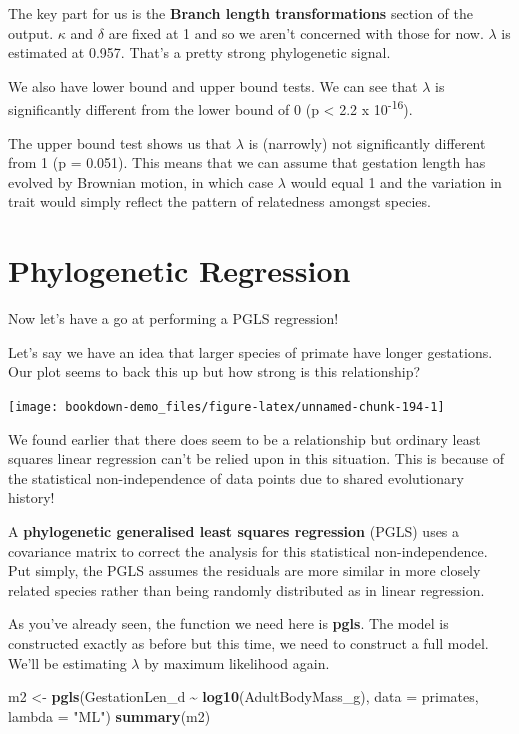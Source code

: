 \documentclass[
]{book}
\newenvironment{Shaded}{\begin{snugshade}}{\end{snugshade}}
\newcommand{\DataTypeTok}[1]{\textcolor[rgb]{0.13,0.29,0.53}{#1}}
\newcommand{\KeywordTok}[1]{\textcolor[rgb]{0.13,0.29,0.53}{\textbf{#1}}}
\newcommand{\NormalTok}[1]{#1}
\newcommand{\OperatorTok}[1]{\textcolor[rgb]{0.81,0.36,0.00}{\textbf{#1}}}
\newcommand{\StringTok}[1]{\textcolor[rgb]{0.31,0.60,0.02}{#1}}
\begin{document}
The key part for us is the \textbf{Branch length transformations} section of the output. \(\kappa\) and \(\delta\) are fixed at 1 and so we aren't concerned with those for now. \(\lambda\) is estimated at 0.957. That's a pretty strong phylogenetic signal.

We also have lower bound and upper bound tests. We can see that \(\lambda\) is significantly different from the lower bound of 0 (p \textless{} 2.2 x 10\textsuperscript{-16}).

The upper bound test shows us that \(\lambda\) is (narrowly) not significantly different from 1 (p = 0.051). This means that we can assume that gestation length has evolved by Brownian motion, in which case \(\lambda\) would equal 1 and the variation in trait would simply reflect the pattern of relatedness amongst species.

\hypertarget{phylogenetic-regression}{%
\section{Phylogenetic Regression}\label{phylogenetic-regression}}

Now let's have a go at performing a PGLS regression!

Let's say we have an idea that larger species of primate have longer gestations. Our plot seems to back this up but how strong is this relationship?

\begin{center}\texttt{[image: bookdown-demo\_files/figure-latex/unnamed-chunk-194-1]} \end{center}

We found earlier that there does seem to be a relationship but ordinary least squares linear regression can't be relied upon in this situation. This is because of the statistical non-independence of data points due to shared evolutionary history!

A \textbf{phylogenetic generalised least squares regression} (PGLS) uses a covariance matrix to correct the analysis for this statistical non-independence. Put simply, the PGLS assumes the residuals are more similar in more closely related species rather than being randomly distributed as in linear regression.

As you've already seen, the function we need here is \textbf{pgls}. The model is constructed exactly as before but this time, we need to construct a full model. We'll be estimating \(\lambda\) by maximum likelihood again.

\begin{Shaded}
\begin{Highlighting}[]
\NormalTok{m2 \textless{}{-}}\StringTok{ }\KeywordTok{pgls}\NormalTok{(GestationLen\_d }\OperatorTok{\textasciitilde{}}\StringTok{ }\KeywordTok{log10}\NormalTok{(AdultBodyMass\_g), }\DataTypeTok{data =}\NormalTok{ primates, }\DataTypeTok{lambda =} \StringTok{"ML"}\NormalTok{)}
\KeywordTok{summary}\NormalTok{(m2)}
\end{Highlighting}
\end{Shaded}
\end{document}
